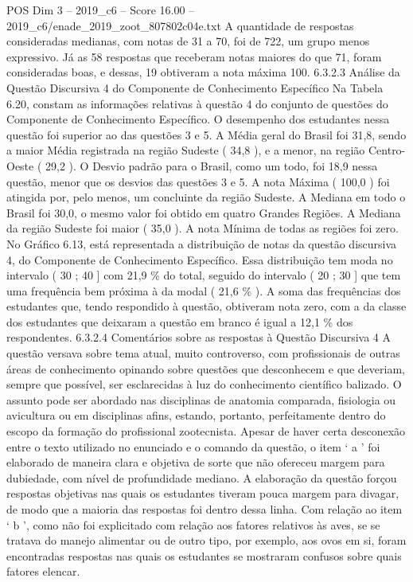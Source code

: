 \begin{textsample}{POS Dim 3 – 2019\_c6 – Score 16.00 – 2019\_c6/enade\_2019\_zoot\_807802c04e.txt}
A quantidade de respostas consideradas medianas, com notas de 31 a 70, foi de 722, um grupo menos expressivo.
Já as 58 respostas que receberam notas maiores do que 71, foram consideradas boas, e dessas, 19 obtiveram a nota máxima 100. 6.3.2.3 Análise da Questão Discursiva 4 do Componente de Conhecimento Específico Na Tabela 6.20, constam as informações relativas à questão 4 do conjunto de questões do Componente de Conhecimento Específico.
O desempenho dos estudantes nessa questão foi superior ao das questões 3 e 5.
A Média geral do Brasil foi 31,8, sendo a maior Média registrada na região Sudeste ( 34,8 ), e a menor, na região Centro-Oeste ( 29,2 ).
O Desvio padrão para o Brasil, como um todo, foi 18,9 nessa questão, menor que os desvios das questões 3 e 5.
A nota Máxima ( 100,0 ) foi atingida por, pelo menos, um concluinte da região Sudeste.
A Mediana em todo o Brasil foi 30,0, o mesmo valor foi obtido em quatro Grandes Regiões.
A Mediana da região Sudeste foi maior ( 35,0 ).
A nota Mínima de todas as regiões foi zero.
No Gráfico 6.13, está representada a distribuição de notas da questão discursiva 4, do Componente de Conhecimento Específico.
Essa distribuição tem moda no intervalo ( 30 ; 40 ] com 21,9 \% do total, seguido do intervalo ( 20 ; 30 ] que tem uma frequência bem próxima à da modal ( 21,6 \% ).
A soma das frequências dos estudantes que, tendo respondido à questão, obtiveram nota zero, com a da classe dos estudantes que deixaram a questão em branco é igual a 12,1 \% dos respondentes. 6.3.2.4 Comentários sobre as respostas à Questão Discursiva 4 A questão versava sobre tema atual, muito controverso, com profissionais de outras áreas de conhecimento opinando sobre questões que desconhecem e que deveriam, sempre que possível, ser esclarecidas à luz do conhecimento científico balizado.
O assunto pode ser abordado nas disciplinas de anatomia comparada, fisiologia ou avicultura ou em disciplinas afins, estando, portanto, perfeitamente dentro do escopo da formação do profissional zootecnista.
Apesar de haver certa desconexão entre o texto utilizado no enunciado e o comando da questão, o item ‘ a ’ foi elaborado de maneira clara e objetiva de sorte que não ofereceu margem para dubiedade, com nível de profundidade mediano.
A elaboração da questão forçou respostas objetivas nas quais os estudantes tiveram pouca margem para divagar, de modo que a maioria das respostas foi dentro dessa linha.
Com relação ao item ‘ b ’, como não foi explicitado com relação aos fatores relativos às aves, se se tratava do manejo alimentar ou de outro tipo, por exemplo, aos ovos em si, foram encontradas respostas nas quais os estudantes se mostraram confusos sobre quais fatores elencar.

\end{textsample}
